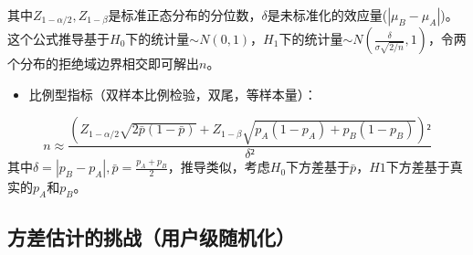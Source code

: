 \documentclass[
  letterpaper,
  DIV=11,
  numbers=noendperiod]{scrreprt}
\providecommand{\tightlist}{%
  \setlength{\itemsep}{0pt}\setlength{\parskip}{0pt}}
\begin{document}
其中\(Z_{1-\alpha/2},Z_{1-\beta}\)是标准正态分布的分位数，\(\delta\)是未标准化的效应量(\(|\mu_B-\mu_A|\))。这个公式推导基于\(H_0\)下的统计量\(\sim N(0, 1)\)，\(H_1\)下的统计量\(\sim N(\frac{\delta}{\sigma \sqrt{2/n}}, 1)\)，令两个分布的拒绝域边界相交即可解出\(n\)。

\begin{itemize}
\tightlist
\item
  比例型指标（双样本比例检验，双尾，等样本量）：
\end{itemize}

\[n \approx \frac{ (Z_{1-\alpha/2} \sqrt{2\bar{p}(1-\bar{p})} + Z_{1-\beta} \sqrt{p_A(1-p_A) + p_B(1-p_B)} )² }{\delta²}\]
其中\(\delta = |p_B-p_A|,\bar{p} = \frac{p_A+p_B}{2}\)，推导类似，考虑\(H_0\)下方差基于\(\bar{p}\)，\(H1\)下方差基于真实的\(p_A\)和\(p_B\)。

\subsection{方差估计的挑战（用户级随机化）}\label{ux65b9ux5deeux4f30ux8ba1ux7684ux6311ux6218ux7528ux6237ux7ea7ux968fux673aux5316}
\end{document}
